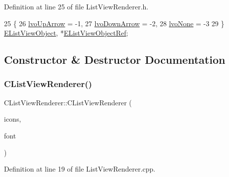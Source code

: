 Definition at line 25 of file List\+View\+Renderer.\+h.


\begin{DoxyCode}
25                     \{
26             \hyperlink{classCListViewRenderer_a120f3c9b0b96dd6e9bce814a52aafb93a097e5e7377e3436187159f67e1aafbe1}{lvoUpArrow} = -1,
27             \hyperlink{classCListViewRenderer_a120f3c9b0b96dd6e9bce814a52aafb93af916162772cb53552d541174c8354036}{lvoDownArrow} = -2,
28             \hyperlink{classCListViewRenderer_a120f3c9b0b96dd6e9bce814a52aafb93a2c1b367eb65f29abd94562e57d58560a}{lvoNone} = -3
29         \} \hyperlink{classCListViewRenderer_a120f3c9b0b96dd6e9bce814a52aafb93}{EListViewObject}, *\hyperlink{classCListViewRenderer_a480fc50c1a5f78ff25b83a8c7973ebd3}{EListViewObjectRef};
\end{DoxyCode}


\subsection{Constructor \& Destructor Documentation}
\hypertarget{classCListViewRenderer_af84040577d38c39d1e7bbf7b5e62bd74}{}\label{classCListViewRenderer_af84040577d38c39d1e7bbf7b5e62bd74} 
\subsubsection{\texorpdfstring{C\+List\+View\+Renderer()}{CListViewRenderer()}}
{\footnotesize\ttfamily C\+List\+View\+Renderer\+::\+C\+List\+View\+Renderer (\begin{DoxyParamCaption}\item[{std\+::shared\+\_\+ptr$<$ \hyperlink{classCGraphicTileset}{C\+Graphic\+Tileset} $>$}]{icons,  }\item[{std\+::shared\+\_\+ptr$<$ \hyperlink{classCFontTileset}{C\+Font\+Tileset} $>$}]{font }\end{DoxyParamCaption})}



Definition at line 19 of file List\+View\+Renderer.\+cpp.


